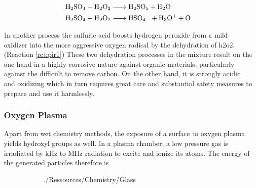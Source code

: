 \begin{align}
	\ce{H2SO4 + H2O2 &-> H2SO5 + H2O} \label{rct:pir1}\\
	\ce{H2SO4 + H2O2 &-> HSO4- + H3O+ + O} \label{rct:pir2}
\end{align}

In another process the sulfuric acid boosts hydrogen peroxide from a mild oxidizer into the more aggressive oxygen radical by the dehydration of \gls{h2o2}. (Reaction \ref{rct:pir1})  These two dehydration processes in the mixture result on the one hand in a highly corrosive nature against organic materials, particularly against the difficult to remove carbon. On the other hand, it is strongly acidic and oxidizing which in turn requires great care and substantial safety measures to prepare and use it harmlessly.


\subsubsection{Oxygen Plasma}
Apart from wet chemistry methods, the exposure of a surface to oxygen plasma yields \gls{hydroxyl} groups as well. In a plasma chamber, a low pressure gas is irradiated by \si{\kilo\hertz} to \si{\mega\hertz} radiation to excite and ionize its atoms. The energy of the generated particles therefore is  


\begin{figure}[b!]
	\begin{subfigure}[b]{0.30\textwidth}
		\centering
		\addtocounter{subfigure}{1}  
		 {./Ressources/Chemistry/Glass}		
		\addtocounter{subfigure}{-1}  
		\label{fig:chem:func:glass}
	\end{subfigure}%
	\hfill
	\begin{subfigure}[b]{0.69\textwidth}
		\centering
		\addtocounter{subfigure}{1}  
		\addtocounter{subfigure}{-1}  
		\label{fig:chem:func:pdms}
	\end{subfigure}
\end{figure}


